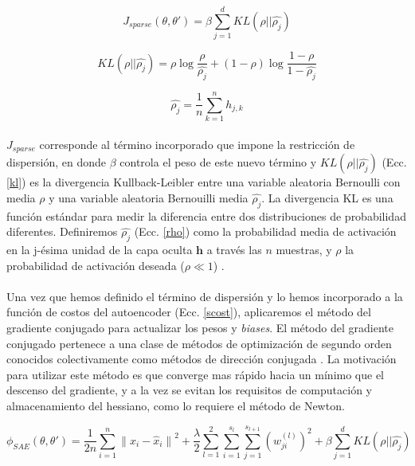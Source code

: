\documentclass[12pt]{article}%
\begin{document}
\begin{equation}
J_{sparse}(\theta,\theta')=\beta\sum_{j=1}^{d}KL(\rho||\hat{\rho_{j}})
\end{equation} 

\begin{equation}
\label{kl}
KL(\rho||\hat{\rho_{j}})={\rho} \log\frac{\rho}{\hat{\rho_{j}}}+(1-\rho)\log\frac{1-\rho}{1-\hat{\rho_{j}}}
\end{equation} 

\begin{equation}
\label{rho}
\hat{\rho_{j}}=\frac{1}{n}\sum_{k=1}^{n}h_{j,k}
\end{equation} 

\paragraph{}
$J_{sparse}$ corresponde al término incorporado que impone la restricción de dispersión, en donde $\beta$ controla el peso de este nuevo término y $KL(\rho||\hat{\rho_{j}})$ (Ecc. \ref{kl}) es la divergencia Kullback-Leibler entre una variable aleatoria Bernoulli con media $\rho$ y una variable aleatoria Bernouilli media $\hat{\rho_{j}}$. La divergencia KL es una función estándar para medir la diferencia entre dos distribuciones de probabilidad diferentes. 
Definiremos $\hat{\rho_{j}}$ (Ecc. \ref{rho}) como la probabilidad media de activación en la j-ésima unidad de la capa oculta $\textbf{h}$ a través las $n$ muestras, y $\rho$ la probabilidad de activación deseada ($\rho\ll1$) \cite{song}. 

\paragraph{}
Una vez que hemos definido el término de dispersión y lo hemos incorporado a la función de costos del autoencoder (Ecc. \ref{scost}), aplicaremos el método del gradiente conjugado para actualizar los pesos y \textit{biases}. El método del gradiente conjugado pertenece a una clase de métodos de optimización de segundo orden conocidos colectivamente como métodos de dirección conjugada \cite{haykin}. La motivación para utilizar este método es que converge mas rápido hacia un mínimo que el descenso del gradiente, y a la vez se evitan los requisitos de computación y almacenamiento del hessiano, como lo requiere el método de Newton.

\begin{equation}
\label{scost}
\phi_{SAE}(\theta,\theta')=\frac{1}{2n}\sum_{i=1}^{n}{\|x_{i}-\hat{x}_{i}\|}^2 + \frac{\lambda}{2}\sum_{l=1}^{2}\sum_{i=1}^{s_l}\sum_{j=1}^{s_{l+1}}({w^{(l)}_{ji}})^2 + \beta\sum_{j=1}^{d}KL(\rho||\hat{\rho_{j}})
\end{equation} 
\end{document}
